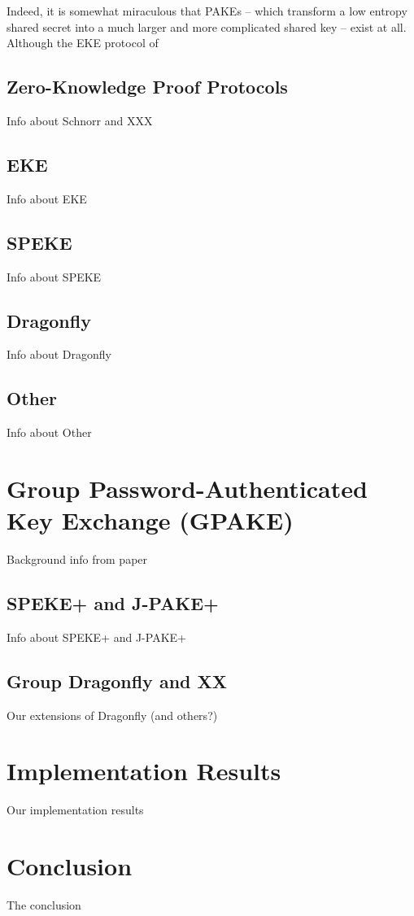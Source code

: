 \documentclass{amsart}
\theoremstyle{remark}
\begin{document}
 Indeed, it is somewhat miraculous that PAKEs -- which transform a low entropy shared secret into a much larger and more complicated shared key -- exist at all.  Although the EKE protocol of 

\subsection{Zero-Knowledge Proof Protocols}
Info about Schnorr and XXX

\subsection{EKE} 
Info about EKE

\subsection{SPEKE}
Info about SPEKE

\subsection{Dragonfly}
\label{sec:Dragon}
Info about Dragonfly

\subsection{Other}
\label{sec:Other}
Info about Other


\section{Group Password-Authenticated Key Exchange (GPAKE)} Background info from paper
\label{sec:GPAKE}


\subsection{SPEKE+ and J-PAKE+}
Info about SPEKE+ and J-PAKE+

\subsection{Group Dragonfly and XX}
Our extensions of Dragonfly (and others?)


\section{Implementation Results}
\label{sec:Implementation}
Our implementation results 


\section{Conclusion}
\label{sec:Conclusion}
The conclusion



\nocite{*}



\end{document}
